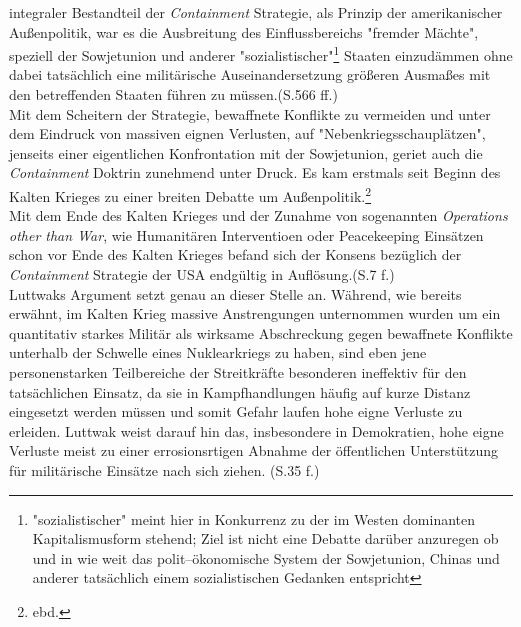 \documentclass[11pt,a4paper,oneside,numbers=noenddot,bibliography=totocnumbered,DIV=13]{scrartcl}
\begin{document}
integraler Bestandteil der \textit{Containment} Strategie, als Prinzip der  amerikanischer Außenpolitik, war es die Ausbreitung des Einflussbereichs "fremder Mächte", speziell der Sowjetunion und anderer "sozialistischer"\footnote{"sozialistischer" meint hier in Konkurrenz zu der im Westen dominanten Kapitalismusform stehend; Ziel ist nicht eine Debatte darüber anzuregen ob und in wie weit das polit--ökonomische System der Sowjetunion, Chinas und anderer tatsächlich einem sozialistischen Gedanken entspricht} Staaten einzudämmen ohne dabei tatsächlich eine militärische Auseinandersetzung größeren Ausmaßes mit den betreffenden Staaten führen zu müssen.(\cite{olson_war_2007}S.566 ff.)\\         
Mit dem Scheitern der Strategie, bewaffnete Konflikte zu vermeiden und unter dem Eindruck von massiven eignen Verlusten, auf "Nebenkriegsschauplätzen", jenseits einer eigentlichen Konfrontation mit der Sowjetunion, geriet auch die \textit{Containment} Doktrin zunehmend unter Druck. Es kam erstmals seit Beginn des Kalten Krieges zu einer breiten Debatte um Außenpolitik.\footnote{ebd.}\\
Mit dem Ende des Kalten Krieges und der Zunahme von sogenannten \textit{Operations other than War}, wie Humanitären Interventioen oder Peacekeeping Einsätzen schon vor Ende des Kalten Krieges befand sich der Konsens bezüglich der \textit{Containment} Strategie der USA endgültig in Auflösung.(\cite{coker_postmodern_2008}S.7 f.)\\
Luttwaks Argument setzt genau an dieser Stelle an. Während, wie bereits erwähnt, im Kalten Krieg massive Anstrengungen unternommen wurden um ein quantitativ starkes Militär als wirksame Abschreckung gegen bewaffnete Konflikte unterhalb der Schwelle eines Nuklearkriegs zu haben, sind eben jene personenstarken Teilbereiche der Streitkräfte besonderen ineffektiv für den tatsächlichen Einsatz, da sie in Kampfhandlungen häufig auf kurze Distanz eingesetzt werden müssen und somit Gefahr laufen hohe eigne Verluste zu erleiden. Luttwak weist darauf hin das, insbesondere in Demokratien, hohe eigne Verluste meist zu einer errosionsrtigen Abnahme der öffentlichen Unterstützung für militärische Einsätze nach sich ziehen. (\cite{Luttwak1996}S.35 f.)\\
\end{document}
